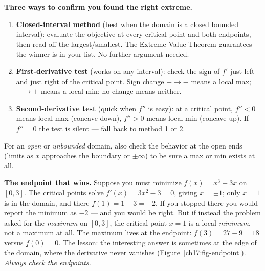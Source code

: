 \begin{focusbox}
\textbf{Three ways to confirm you found the right extreme.}
\begin{enumerate}
  \item \textbf{Closed-interval method} (best when the domain is a closed bounded
    interval): evaluate the objective at every critical point and both endpoints,
    then read off the largest/smallest. The Extreme Value Theorem guarantees the
    winner is in your list. No further argument needed.
  \item \textbf{First-derivative test} (works on any interval): check the sign of
    $f'$ just left and just right of the critical point. Sign change $+\to-$ means a
    local max; $-\to+$ means a local min; no change means neither.
  \item \textbf{Second-derivative test} (quick when $f''$ is easy): at a critical
    point, $f''<0$ means local max (concave down), $f''>0$ means local min (concave
    up). If $f''=0$ the test is silent --- fall back to method 1 or 2.
\end{enumerate}
For an \emph{open} or \emph{unbounded} domain, also check the behavior at the open
ends (limits as $x$ approaches the boundary or $\pm\infty$) to be sure a max or min
exists at all.
\end{focusbox}

\begin{trapbox}
\textbf{The endpoint that wins.} Suppose you must minimize $f(x) = x^3 - 3x$ on
$[0, 3]$. The critical points solve $f'(x) = 3x^2 - 3 = 0$, giving $x=\pm 1$; only
$x=1$ is in the domain, and there $f(1) = 1 - 3 = -2$. If you stopped there you would
report the minimum as $-2$ --- and you would be right. But if instead the problem asked
for the \emph{maximum} on $[0,3]$, the critical point $x=1$ is a local \emph{minimum},
not a maximum at all. The maximum lives at the endpoint: $f(3) = 27 - 9 = 18$ versus
$f(0)=0$. The lesson: the interesting answer is sometimes at the edge of the domain,
where the derivative never vanishes (Figure~\ref{ch17:fig-endpoint}).
\emph{Always check the endpoints.}
\end{trapbox}

